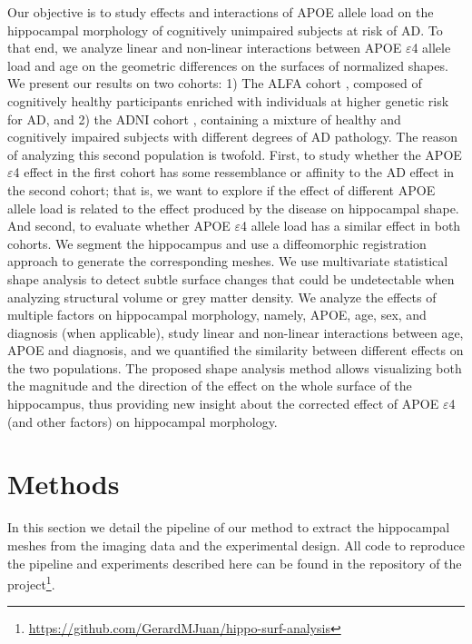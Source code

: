 Our objective is to study effects and interactions of APOE allele load on the hippocampal morphology of cognitively unimpaired subjects at risk of AD. To that end, we analyze linear and non-linear interactions between APOE $\varepsilon$4 allele load and age on the geometric differences on the surfaces of normalized shapes. We present our results on two cohorts: 1) The ALFA cohort \cite{Molinuevo2016}, composed of cognitively healthy participants enriched with individuals at higher genetic risk for AD, and 2) the ADNI cohort \cite{Mueller2005}, containing a mixture of healthy and cognitively impaired subjects with different degrees of AD pathology. The reason of analyzing this second population is twofold. First, to study whether the APOE $\varepsilon$4 effect in the first cohort has some ressemblance or affinity to the AD effect in the second cohort; that is, we want to explore if the effect of different APOE allele load is related to the effect produced by the disease on hippocampal shape. And second, to evaluate whether APOE $\varepsilon$4 allele load has a similar effect in both cohorts. We segment the hippocampus and use a diffeomorphic registration approach to generate the corresponding meshes. We use multivariate statistical shape analysis to detect subtle surface changes that could be undetectable when analyzing structural volume or grey matter density. We analyze the effects of multiple factors on hippocampal morphology, namely, APOE, age, sex, and diagnosis (when applicable), study linear and non-linear interactions between age, APOE and diagnosis, and we quantified the similarity between different effects on the two populations. The proposed shape analysis method allows visualizing both the magnitude and the direction of the effect on the whole surface of the hippocampus, thus providing new insight about the corrected effect of APOE $\varepsilon$4 (and other factors) on hippocampal morphology.  \\

\section{Methods}
\label{sec:methods}

In this section we detail the pipeline of our method to extract the hippocampal meshes from the imaging data and the experimental design. All code to reproduce the pipeline and experiments described here can be found in the repository of the project\footnote{\url{https://github.com/GerardMJuan/hippo-surf-analysis}}.

